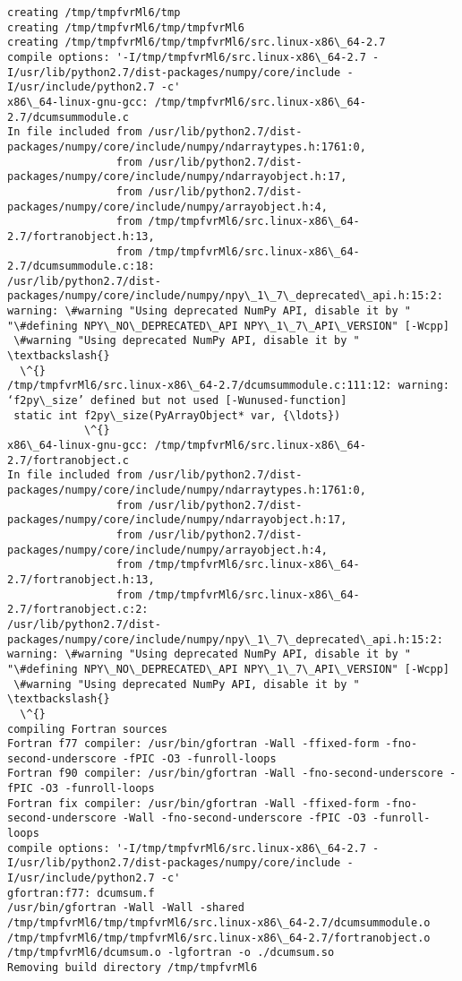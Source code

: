 \begin{Verbatim}[commandchars=\\\{\}]
creating /tmp/tmpfvrMl6/tmp
creating /tmp/tmpfvrMl6/tmp/tmpfvrMl6
creating /tmp/tmpfvrMl6/tmp/tmpfvrMl6/src.linux-x86\_64-2.7
compile options: '-I/tmp/tmpfvrMl6/src.linux-x86\_64-2.7 -I/usr/lib/python2.7/dist-packages/numpy/core/include -I/usr/include/python2.7 -c'
x86\_64-linux-gnu-gcc: /tmp/tmpfvrMl6/src.linux-x86\_64-2.7/dcumsummodule.c
In file included from /usr/lib/python2.7/dist-packages/numpy/core/include/numpy/ndarraytypes.h:1761:0,
                 from /usr/lib/python2.7/dist-packages/numpy/core/include/numpy/ndarrayobject.h:17,
                 from /usr/lib/python2.7/dist-packages/numpy/core/include/numpy/arrayobject.h:4,
                 from /tmp/tmpfvrMl6/src.linux-x86\_64-2.7/fortranobject.h:13,
                 from /tmp/tmpfvrMl6/src.linux-x86\_64-2.7/dcumsummodule.c:18:
/usr/lib/python2.7/dist-packages/numpy/core/include/numpy/npy\_1\_7\_deprecated\_api.h:15:2: warning: \#warning "Using deprecated NumPy API, disable it by " "\#defining NPY\_NO\_DEPRECATED\_API NPY\_1\_7\_API\_VERSION" [-Wcpp]
 \#warning "Using deprecated NumPy API, disable it by " \textbackslash{}
  \^{}
/tmp/tmpfvrMl6/src.linux-x86\_64-2.7/dcumsummodule.c:111:12: warning: ‘f2py\_size’ defined but not used [-Wunused-function]
 static int f2py\_size(PyArrayObject* var, {\ldots})
            \^{}
x86\_64-linux-gnu-gcc: /tmp/tmpfvrMl6/src.linux-x86\_64-2.7/fortranobject.c
In file included from /usr/lib/python2.7/dist-packages/numpy/core/include/numpy/ndarraytypes.h:1761:0,
                 from /usr/lib/python2.7/dist-packages/numpy/core/include/numpy/ndarrayobject.h:17,
                 from /usr/lib/python2.7/dist-packages/numpy/core/include/numpy/arrayobject.h:4,
                 from /tmp/tmpfvrMl6/src.linux-x86\_64-2.7/fortranobject.h:13,
                 from /tmp/tmpfvrMl6/src.linux-x86\_64-2.7/fortranobject.c:2:
/usr/lib/python2.7/dist-packages/numpy/core/include/numpy/npy\_1\_7\_deprecated\_api.h:15:2: warning: \#warning "Using deprecated NumPy API, disable it by " "\#defining NPY\_NO\_DEPRECATED\_API NPY\_1\_7\_API\_VERSION" [-Wcpp]
 \#warning "Using deprecated NumPy API, disable it by " \textbackslash{}
  \^{}
compiling Fortran sources
Fortran f77 compiler: /usr/bin/gfortran -Wall -ffixed-form -fno-second-underscore -fPIC -O3 -funroll-loops
Fortran f90 compiler: /usr/bin/gfortran -Wall -fno-second-underscore -fPIC -O3 -funroll-loops
Fortran fix compiler: /usr/bin/gfortran -Wall -ffixed-form -fno-second-underscore -Wall -fno-second-underscore -fPIC -O3 -funroll-loops
compile options: '-I/tmp/tmpfvrMl6/src.linux-x86\_64-2.7 -I/usr/lib/python2.7/dist-packages/numpy/core/include -I/usr/include/python2.7 -c'
gfortran:f77: dcumsum.f
/usr/bin/gfortran -Wall -Wall -shared /tmp/tmpfvrMl6/tmp/tmpfvrMl6/src.linux-x86\_64-2.7/dcumsummodule.o /tmp/tmpfvrMl6/tmp/tmpfvrMl6/src.linux-x86\_64-2.7/fortranobject.o /tmp/tmpfvrMl6/dcumsum.o -lgfortran -o ./dcumsum.so
Removing build directory /tmp/tmpfvrMl6

    \end{Verbatim}

